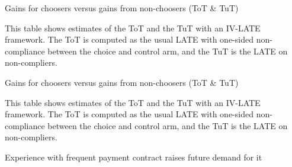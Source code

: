 \documentclass[oneside,11pt]{article}
\begin{document}
\begin{landscape}

\begin{table}[H]
\caption{Gains for choosers versus gains from non-choosers (ToT \& TuT)}
\label{tot_tut}
\begin{center}
\scriptsize{}
\end{center}
 \scriptsize This table shows estimates of the ToT and the TuT with an IV-LATE framework. The ToT is computed as the usual LATE with one-sided non-compliance between the choice and control arm, and the TuT is the LATE on non-compliers. 
\end{table}


\begin{table}[H]
\caption{Gains for choosers versus gains from non-choosers (ToT \& TuT)}
\label{tot_tut}
\begin{center}
\scriptsize{}
\end{center}
 \scriptsize This table shows estimates of the ToT and the TuT with an IV-LATE framework. The ToT is computed as the usual LATE with one-sided non-compliance between the choice and control arm, and the TuT is the LATE on non-compliers. 
\end{table}

\end{landscape}


\begin{table}[H]
\caption{Experience with frequent payment contract raises future demand for it}
\label{learning_not_doing}
\begin{center}
\scriptsize{}
\end{center}
 \scriptsize 
\end{table}




\end{document}

